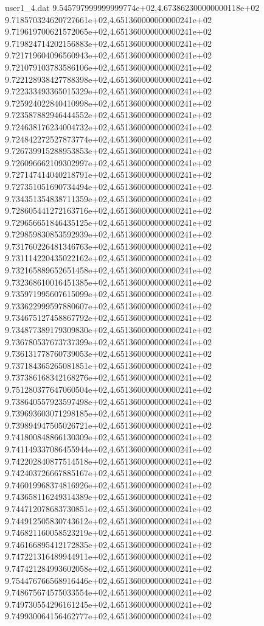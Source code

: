 \begin{filecontents}{user1_4.dat}
9.545797999999999774e+02,4.673862300000000118e+02
9.718570324620727661e+02,4.651360000000000241e+02
9.719619700621572065e+02,4.651360000000000241e+02
9.719824714202156883e+02,4.651360000000000241e+02
9.721719604096560943e+02,4.651360000000000241e+02
9.721079103783586106e+02,4.651360000000000241e+02
9.722128938427788398e+02,4.651360000000000241e+02
9.722333493365015329e+02,4.651360000000000241e+02
9.725924022840410998e+02,4.651360000000000241e+02
9.723587882946444552e+02,4.651360000000000241e+02
9.724638176234004732e+02,4.651360000000000241e+02
9.724842272527873774e+02,4.651360000000000241e+02
9.726739915288953853e+02,4.651360000000000241e+02
9.726096662109302997e+02,4.651360000000000241e+02
9.727147414040218791e+02,4.651360000000000241e+02
9.727351051690734494e+02,4.651360000000000241e+02
9.734351354838711359e+02,4.651360000000000241e+02
9.728605441272163716e+02,4.651360000000000241e+02
9.729656651846435125e+02,4.651360000000000241e+02
9.729859830853592939e+02,4.651360000000000241e+02
9.731760226481346763e+02,4.651360000000000241e+02
9.731114220435022162e+02,4.651360000000000241e+02
9.732165889652651458e+02,4.651360000000000241e+02
9.732368610016451385e+02,4.651360000000000241e+02
9.735971995607615099e+02,4.651360000000000241e+02
9.733622999597880607e+02,4.651360000000000241e+02
9.734675127458867792e+02,4.651360000000000241e+02
9.734877389179309830e+02,4.651360000000000241e+02
9.736780537673737399e+02,4.651360000000000241e+02
9.736131778760739053e+02,4.651360000000000241e+02
9.737184365265081851e+02,4.651360000000000241e+02
9.737386168342168276e+02,4.651360000000000241e+02
9.751280377647060504e+02,4.651360000000000241e+02
9.738640557923597498e+02,4.651360000000000241e+02
9.739693603071298185e+02,4.651360000000000241e+02
9.739894947505026721e+02,4.651360000000000241e+02
9.741800848866130309e+02,4.651360000000000241e+02
9.741149337086455944e+02,4.651360000000000241e+02
9.742202840877514518e+02,4.651360000000000241e+02
9.742403726667885167e+02,4.651360000000000241e+02
9.746019968374816926e+02,4.651360000000000241e+02
9.743658116249314389e+02,4.651360000000000241e+02
9.744712078683730851e+02,4.651360000000000241e+02
9.744912505830743612e+02,4.651360000000000241e+02
9.746821160058523219e+02,4.651360000000000241e+02
9.746166895412172835e+02,4.651360000000000241e+02
9.747221316489944911e+02,4.651360000000000241e+02
9.747421284993602058e+02,4.651360000000000241e+02
9.754476766568916446e+02,4.651360000000000241e+02
9.748675674575033554e+02,4.651360000000000241e+02
9.749730554296161245e+02,4.651360000000000241e+02
9.749930064156462777e+02,4.651360000000000241e+02

\end{filecontents}
